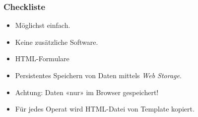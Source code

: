 \documentclass{beamer}
\begin{document}
\begin{frame}[fragile]
  \frametitle{Checkliste}
  \begin{itemize}
  \item Möglichst einfach.
  \item Keine zusätzliche Software.
  \item HTML-Formulare
  \item Persistentes Speichern von Daten mittels \textit{Web Storage}.
  \item Achtung: Daten «nur» im Browser gespeichert!
  \item Für jedes Operat wird HTML-Datei von Template kopiert.
  \end{itemize}
\end{frame}
\end{document}
